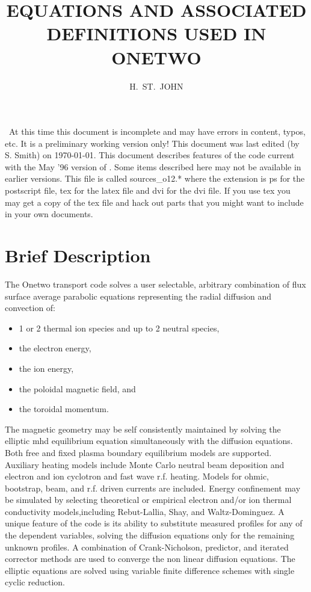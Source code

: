 \title{ EQUATIONS AND ASSOCIATED DEFINITIONS USED IN  ONETWO}
\author{H.~ST.~JOHN}
\date{   }   %
\maketitle


\boldmath\
At this time this document is incomplete and may have errors in
content, typos, etc. It is a preliminary working version only!
This document was last edited (by S. Smith) on \today.
This document describes features of the code current with
the May '96 version of \ot. Some items described here
may not be available in earlier versions. This file is
called  sources\_o12.*  where the extension is ps for the postscript file, 
tex for the latex file and dvi for 
the dvi file. If you use tex you may get a copy
of the tex file and hack out parts that you might want 
to include in your own documents.

\section{Brief Description}
The Onetwo transport code solves a user selectable, arbitrary
combination of flux surface average parabolic equations representing
the radial diffusion and convection of:
\begin{itemize}
\item 1 or 2 thermal ion species and
up to 2 neutral species, 
\item the electron energy, 
\item the ion energy, 
\item the poloidal magnetic field, and 
\item the toroidal momentum.  
\end{itemize}
The magnetic geometry may be
self consistently maintained by solving the elliptic mhd equilibrium
equation simultaneously with the diffusion equations.  Both free and
fixed plasma boundary equilibrium models are supported. Auxiliary
heating models include Monte Carlo neutral beam deposition and electron
and ion cyclotron and fast wave r.f. heating.  Models for ohmic, bootstrap,
beam, and r.f. driven currents are included.  Energy confinement may be
simulated by selecting theoretical or empirical electron and/or ion
thermal conductivity models,including Rebut-Lallia, Shay, and Waltz-Dominguez.  A unique feature of the code is its ability to substitute
measured profiles for any of the dependent variables, solving the
diffusion equations only for the remaining unknown profiles. A combination
of Crank-Nicholson, predictor, and iterated corrector methods are used to
converge the non linear diffusion equations. The elliptic equations are
solved using variable finite difference schemes with single cyclic
reduction.


